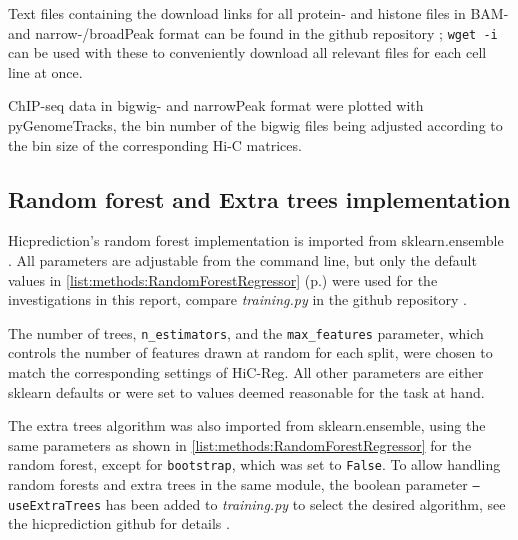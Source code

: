 Text files containing the download links for all protein- and histone files in BAM- and narrow-/broadPeak format can be found in the github repository
\cite{Krauth2020}; \texttt{wget -i} can be used with these to conveniently download all relevant files for each cell line at once.

ChIP-seq data in bigwig- and narrowPeak format were plotted with pyGenomeTracks, 
the bin number of the bigwig files being adjusted according to the bin size of the corresponding Hi-C matrices.

\subsection{Random forest and Extra trees implementation} \label{sec:methods:randomForestImplementation}
Hicprediction's random forest implementation is imported from sklearn.ensemble \cite{Pedregosa2011,scikitEnsemble2019}.
All parameters are adjustable from the command line, but only the default values in \autoref{list:methods:RandomForestRegressor} 
(p.\;\pageref{list:methods:RandomForestRegressor}) were used for the investigations in this report, 
compare \emph{training.py} in the github repository \cite{hicpred2020tr}.

The number of trees, \texttt{n\_estimators}, and the \texttt{max\_features} parameter,
which controls the number of features drawn at random for each split,
were chosen to match the corresponding settings of HiC-Reg.
All other parameters are either sklearn defaults or were set to values deemed reasonable for the task at hand.

The extra trees algorithm was also imported from sklearn.ensemble, 
using the same parameters as shown in \autoref{list:methods:RandomForestRegressor} for the random forest, 
except for \texttt{bootstrap}, which was set to \texttt{False}.
To allow handling random forests and extra trees in the same module, 
the boolean parameter \texttt{--useExtraTrees} has been added to \emph{training.py} to select
the desired algorithm, see the hicprediction github for details \cite{hicpred2020tr}.

